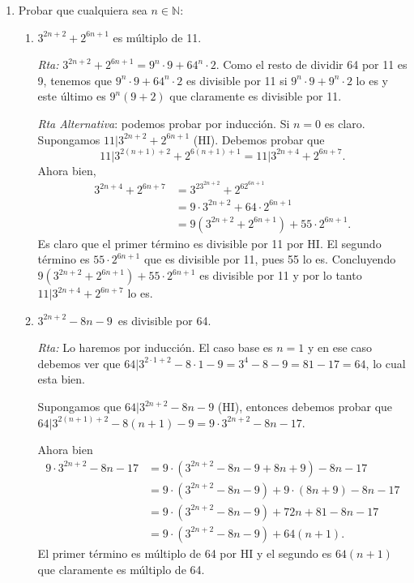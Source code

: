 \documentclass[a4paper,12pt,twoside,spanish,reqno]{amsbook}
\numberwithin{equation}{section}
\newcommand{\rta}{\noindent\textit{Rta: }}
\begin{document}
\begin{enumerate}
\item Probar que cualquiera sea $n \in {\mathbb N}$:
\begin{enumerate}
    \item $3^{2n+2}+ 2^{6n+1}$ es múltiplo de 11.
    
    \rta $3^{2n+2} + 2^{6n+1}=9^n \cdot 9+64^n \cdot 2$. Como el resto de dividir 64 por 11 es 9, tenemos que $9^n \cdot 9+64^n \cdot 2$ es divisible por 11 si $9^n \cdot 9+9^n \cdot 2$ lo es y este último es $9^n(9+2)$ que claramente es divisible por 11.
    
\textit{Rta    Alternativa}: podemos probar por inducción. Si $n=0$ es claro. Supongamos $11\vert 3^{2n+2} + 2^{6n+1}$ (HI). Debemos probar que  
$$11\vert 3^{2(n+1)+2} + 2^{6(n+1)+1} = 11\vert 3^{2n+4} + 2^{6n+7}.$$
Ahora bien,
\begin{align*}
    3^{2n+4} + 2^{6n+7} &=   3^23^{2n+2} + 2^62^{6n+1} \\
    &= 9\cdot3^{2n+2} + 64\cdot2^{6n+1} \\
    &=     9(3^{2n+2} + 2^{6n+1}) +55\cdot 2^{6n+1} .
\end{align*}
   Es claro que el primer término es divisible por 11 por HI. El segundo término es $55\cdot 2^{6n+1}$ que es divisible por 11, pues 55 lo es. Concluyendo $9(3^{2n+2} + 2^{6n+1}) +55\cdot 2^{6n+1} $ es divisible por  11 y por lo tanto  $ 11\vert 3^{2n+4} + 2^{6n+7}$ lo es.
    
    \item $3^{2n+2} - 8n - 9$\, es divisible por 64.
    
    \rta Lo haremos por inducción. El caso base es $n=1$ y  en ese caso debemos ver que $64|3^{2\cdot 1+2} - 8\cdot 1 - 9 = 3^4-8-9 = 81-17 =64$, lo cual esta bien.
    
    Supongamos que $64|3^{2n+2} - 8n - 9$ (HI),  entonces debemos probar que $64|3^{2(n+1)+2} - 8(n+1) - 9 = 9\cdot 3^{2n+2} - 8n -17$. 
    
    Ahora bien   
    \begin{align*}
        9\cdot 3^{2n+2} - 8n -17 &=  9\cdot (3^{2n+2} - 8n - 9 + 8n + 9) - 8n -17 \\
        &=   9\cdot (3^{2n+2} - 8n - 9) + 9\cdot(8n + 9) - 8n -17 \\
        &=  9\cdot (3^{2n+2} - 8n - 9) + 72n + 81 - 8n -17 \\
        &= 9\cdot (3^{2n+2} - 8n - 9) + 64(n+1).
    \end{align*}
    El primer término es múltiplo de 64 por HI y  el segundo es $64(n+1)$ que claramente es múltiplo de 64.


\end{enumerate}
\end{enumerate}
\end{document}
